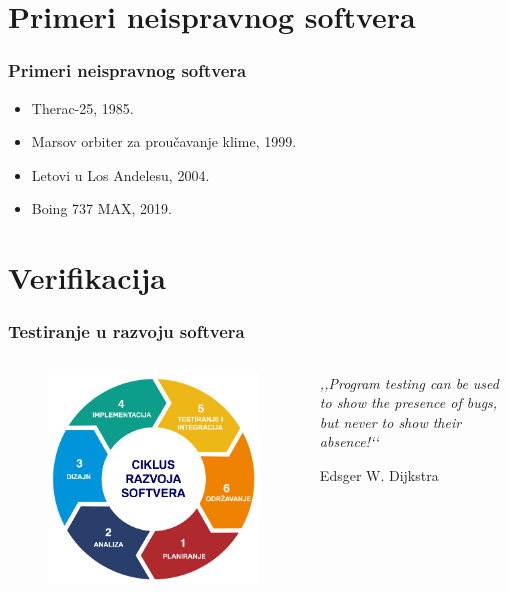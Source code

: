 \documentclass{beamer}
\begin{document}
\section{Primeri neispravnog softvera}
\begin{frame}
\frametitle{Primeri neispravnog softvera}
\begin{itemize}
\item Therac-25, 1985.
\item Marsov orbiter za proučavanje klime, 1999.
\item Letovi u Los Andelesu, 2004.
\item Boing 737 MAX, 2019.
\end{itemize}
\end{frame}

\section{Verifikacija}
\begin{frame}
\frametitle{Testiranje u razvoju softvera}
\begin{columns}[c] %
\begin{figure}
\includegraphics[width=1\linewidth]{rs.png}
\end{figure}

\epigraph{\emph{,,Program testing can be used to show the presence of bugs, but never to show their absence!‘‘}}{Edsger W. Dijkstra}

\end{columns}
\end{frame}
\end{document}

